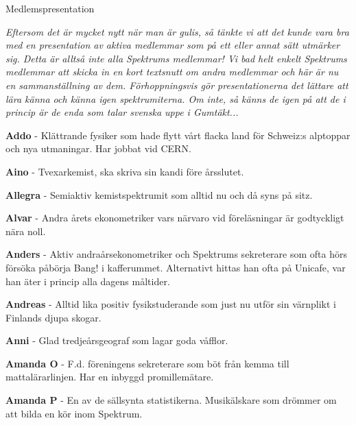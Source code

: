 \documentclass{spektraklet}
\begin{document}
\begin{artikel}{Medlemspresentation}{}

\textit{Eftersom det är mycket nytt när man är gulis, så tänkte vi att det kunde vara bra med en presentation av aktiva medlemmar som på ett eller annat sätt utmärker sig. Detta är alltså inte alla Spektrums medlemmar! Vi bad helt enkelt Spektrums medlemmar att skicka in en kort textsnutt om andra medlemmar och här är nu en sammanställning av dem. Förhoppningsvis gör presentationerna det lättare att lära känna och känna igen spektrumiterna. Om inte, så känns de igen på att de i princip är de enda som talar svenska uppe i Gumtäkt...}

\begin{twocolumns}



\textbf{Addo} - Klättrande fysiker som hade flytt vårt flacka land för Schweiz:s alptoppar och nya utmaningar. Har jobbat vid CERN.

\textbf{Aino} - Tvexarkemist, ska skriva sin kandi före årsslutet.

\textbf{Allegra} - Semiaktiv kemistspektrumit som alltid nu och då syns på sitz.

\textbf{Alvar} - Andra årets ekonometriker vars närvaro vid föreläsningar är godtyckligt nära noll.

\textbf{Anders} - Aktiv andraårsekonometriker och Spektrums sekreterare som ofta hörs försöka påbörja Bang! i kafferummet. Alternativt hittas han ofta på Unicafe, var han äter i princip alla dagens måltider.

\textbf{Andreas} - Alltid lika positiv fysikstuderande som just nu utför sin värnplikt i Finlands djupa skogar.

\textbf{Anni} - Glad tredjeårsgeograf som lagar goda våfflor. %

\textbf{Amanda O} - F.d. föreningens sekreterare som böt från kemma till mattalärarlinjen. Har en inbyggd promillemätare.

\textbf{Amanda P} - En av de sällsynta statistikerna. Musikälskare som drömmer om att bilda en kör inom Spektrum.


\end{twocolumns}
\end{artikel}
\end{document}
